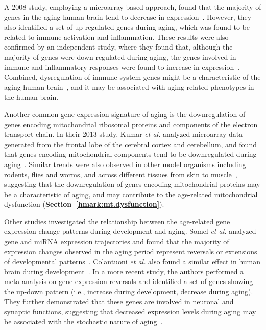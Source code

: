 A 2008 study, employing a microarray-based approach, found that the majority of genes in the aging human brain tend to decrease in expression~\autocite{Berchtold2008}.
However, they also identified a set of up-regulated genes during aging, which was found to be related to immune activation and inflammation.
These results were also confirmed by an independent study, where they found that, although the majority of genes were down-regulated during aging,
the genes involved in immune and inflammatory responses were found to increase in expression~\autocite{Lu2004}.
Combined, dysregulation of immune system genes might be a characteristic of the aging human brain~\autocite{Frenk2018}, 
and it may be associated with aging-related phenotypes in the human brain.

Another common gene expression signature of aging is the downregulation of genes encoding mitochondrial ribosomal proteins and components of the electron transport chain.
In their 2013 study, Kumar \textit{et al.} analyzed microarray data generated from the frontal lobe of the cerebral cortex and cerebellum,
and found that genes encoding mitochondrial components tend to be downregulated during aging~\autocite{Kumar2013}.
Similar trends were also observed in other model organisms including rodents, flies and worms, and across different tissues from skin to muscle~\autocite{Frenk2018},
suggesting that the downregulation of genes encoding mitochondrial proteins may be a characteristic of aging, 
and may contribute to the age-related mitochondrial dysfunction (\textbf{Section~\ref{hmark:mt.dysfunction}}).

Other studies investigated the relationship between the age-related gene expression change patterns during development and aging.
Somel \textit{et al.} analyzed gene and miRNA expression trajectories and found that 
the majority of expression changes observed in the aging period represent reversals or extensions of developmental patterns~\autocite{Somel2010}.
Colantuoni \textit{et al.} also found a similar effect in human brain during development~\autocite{Colantuoni2011}.
In a more recent study, the authors performed a meta-analysis on gene expression reversals 
and identified a set of genes showing the up-down pattern (i.e., increase during development, decrease during aging).
They further demonstrated that these genes are involved in neuronal and synaptic functions, suggesting that
decreased expression levels during aging may be associated with the stochastic nature of aging~\autocite{Donertas2017}.

